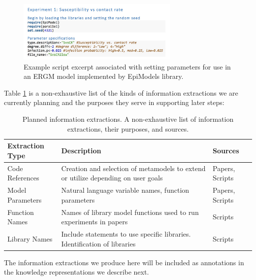 \documentclass{article}
\begin{document}
\begin{figure}[H]
    \centering
    \includegraphics[width=0.7\textwidth]{covar_fig1.jpg}
    \caption{Example script excerpt associated with \cite{doi:10.1111/oik.04527} setting parameters for use in an ERGM model implemented by EpiModels library.}
    \label{fig:covar_paper1}
\end{figure}

Table \ref{table:info_extract} is a non-exhaustive list of the kinds of information extractions we are currently planning and the purposes they serve in supporting later steps:
\begin{table}[htbp]
    \centering
\begin{tabular}{ p{3.5cm} p{7cm} p{3cm}   }
\toprule
  Extraction Type  & Description & Sources\\
 \midrule
Code References & Creation and selection of metamodels to extend or utilize depending on user goals & Papers, Scripts\\ 
Model Parameters & Natural language variable names, function parameters & Papers, Scripts\\
Function Names & Names of library model functions used to run experiments in papers  & Scripts\\ 
Library Names & Include statements to use specific libraries. Identification of libraries & Scripts  \\ 

 \bottomrule
\end{tabular}
\caption{Planned information extractions. A non-exhaustive list of information extractions, their purposes, and sources.}
    \label{table:info_extract}
\end{table}

The information extractions we produce here will be included as annotations in the knowledge representations we describe next.
\end{document}
